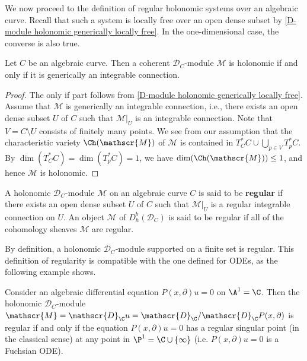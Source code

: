 We now proceed to the definition of regular holonomic systems over an algebraic curve. Recall that such a system is locally free over an open dense subset by \cref{D-module holonomic generically locally free}. In the one-dimensional case, the converse is also true.
\begin{lemma}\label{D-module on curve holonomic iff generaically locally free}
Let $C$ be an algebraic curve. Then a coherent $\mathscr{D}_C$-module $\mathscr{M}$ is holonomic if and only if it is generically an integrable connection.
\end{lemma}
\begin{proof}
The only if part follows from \cref{D-module holonomic generically locally free}. Assume that $\mathscr{M}$ is generically an integrable connection, i.e., there exists an open dense subset $U$ of $C$ such that $\mathscr{M}|_U$ is an integrable connection. Note that $V=C\setminus U$ consists of finitely many points. We see from our assumption that the characteristic variety $\Ch(\mathscr{M})$ of $\mathscr{M}$ is contained in $T^*_CC\cup\bigcup_{p\in V}T^*_pC$. By $\dim(T^*_CC)=\dim(T^*_pC)=1$, we have $\dim(\Ch(\mathscr{M}))\leq 1$, and hence $\mathscr{M}$ is holonomic.
\end{proof}

\begin{definition}\label{D-module holonomic on curve regular def}
A holonomic $\mathscr{D}_C$-module $\mathscr{M}$ on an algebraic curve $C$ is said to be \textbf{regular} if there exists an open dense subset $U$ of $C$ such that $\mathscr{M}|_U$ is a regular integrable connection on $U$. An object $\mathscr{M}$ of $D^b_h(\mathscr{D}_C)$ is said to be regular if all of the cohomology sheaves $\mathscr{M}$ are regular.
\end{definition}

By definition, a holonomic $\mathscr{D}_C$-module supported on a finite set is regular. This definition of regularity is compatible with the one defined for ODEs, as the following example shows.

\begin{example}
Consider an algebraic differential equation $P(x,\partial)u=0$ on $\A^1=\C$. Then the holonomic $\mathscr{D}_C$-module $\mathscr{M}=\mathscr{D}_{\C}u=\mathscr{D}_{\C}/\mathscr{D}_{\C}P(x,\partial)$ is regular if and only if the equation $P(x,\partial)u=0$ has a regular singular point (in the classical sense) at any point in $\P^1=\C\cup\{\infty\}$ (i.e. $P(x,\partial)u=0$ is a Fuchsian ODE).
\end{example}

